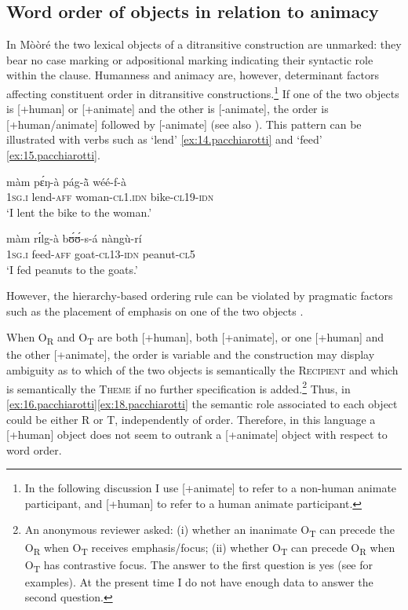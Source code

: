 \documentclass[output=paper]{langsci/langscibook}
\begin{document}
\subsection{Word order of objects in relation to animacy}\label{§4.2:word.pacchiarotti}

In Mòòré the two lexical objects of a ditransitive construction are unmarked: they bear no case marking or adpositional marking indicating their syntactic role within the clause. Humanness and animacy are, however, determinant factors affecting constituent order in ditransitive constructions.\footnote{In the following discussion I use [+animate] to refer to a non-human animate participant, and [+human] to refer to a human animate participant.} If one of the two objects is [+human] or [+animate] and the other is [-animate], the order is [+human/animate] followed by [-animate] (see also \citealt[394]{canu1974}). This pattern can be illustrated with verbs such as `lend' \ref{ex:14.pacchiarotti} and `feed' \ref{ex:15.pacchiarotti}.

\ea
\label{ex:14.pacchiarotti}
\gll m\`{a}m    pɛ́ŋ-à         p\'{a}g-\`{\~{a}}      wéé-f-\`{a}\\
\textsc{1sg.i  }  lend-\textsc{aff}        woman-\textsc{cl1.idn}  bike-\textsc{cl19-idn}\\
\glt `I lent the bike to the woman.'
\z

\ea
\label{ex:15.pacchiarotti}
\gll m\`{a}m    rɪ́lg-\`{a}      bʊ́ʊ́-s-\'{a}    n\`{a}ng\`{u}-r\'{i} \\
\textsc{1sg.i  }  feed-\textsc{aff}    goat-\textsc{cl13-idn}  peanut-\textsc{cl5}\\
\glt `I fed peanuts to the goats.'
\z

However, the hierarchy-based ordering rule can be violated by pragmatic factors such as the placement of emphasis on one of the two objects \citep[375]{kabore1985}.

When O\textsubscript{R} and O\textsubscript{T} are both [+human], both [+animate], or one [+human] and the other [+animate],  the order is variable and the construction may display ambiguity as to which of the two objects is semantically the \textsc{Recipient} and which is semantically the \textsc{Theme} if no further specification is added.\footnote{An anonymous reviewer asked: (i) whether an inanimate O\textsubscript{T} can precede the O\textsubscript{R} when O\textsubscript{T} receives emphasis/focus; (ii) whether O\textsubscript{T} can precede O\textsubscript{R} when O\textsubscript{T} has contrastive focus. The answer to the first question is yes (see \citealt[375]{kabore1985} for examples). At the present time I do not have enough data to answer the second question.} Thus, in \ref{ex:16.pacchiarotti}\ref{ex:18.pacchiarotti} the semantic role associated to each object could be either R or T, independently of order. Therefore, in this language a [+human] object does not seem to outrank a [+animate] object with respect to word order.
\end{document}
